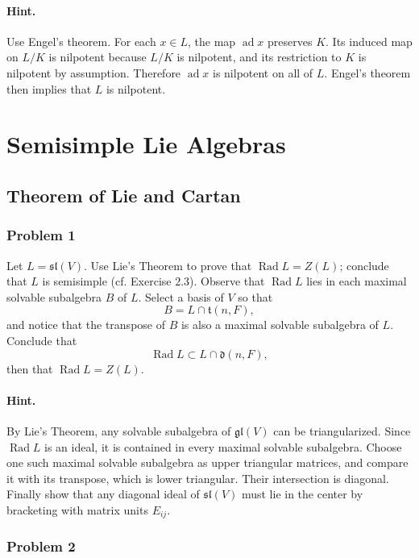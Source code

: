 \documentclass[12pt, a4paper]{article}
\begin{document}
\paragraph{Hint.}
Use Engel's theorem. For each \(x\in L\), the map \(\operatorname{ad}x\) preserves
\(K\). Its induced map on \(L/K\) is nilpotent because \(L/K\) is nilpotent, and
its restriction to \(K\) is nilpotent by assumption. Therefore
\(\operatorname{ad}x\) is nilpotent on all of \(L\). Engel's theorem then
implies that \(L\) is nilpotent.



\section{Semisimple Lie Algebras}

\subsection{Theorem of Lie and Cartan}

\subsubsection{Problem 1}

Let \(L=\mathfrak{sl}(V)\). Use Lie's Theorem to prove that
\(\operatorname{Rad} L=Z(L)\); conclude that \(L\) is semisimple
(cf. Exercise 2.3). Observe that \(\operatorname{Rad}L\) lies in each maximal
solvable subalgebra \(B\) of \(L\). Select a basis of \(V\) so that
\[
B=L\cap \mathfrak{t}(n,F),
\]
and notice that the transpose of \(B\) is also a maximal solvable subalgebra of
\(L\). Conclude that
\[
\operatorname{Rad}L\subset L\cap \mathfrak{d}(n,F),
\]
then that \(\operatorname{Rad}L=Z(L)\).

\paragraph{Hint.}
By Lie's Theorem, any solvable subalgebra of \(\mathfrak{gl}(V)\) can be
triangularized. Since \(\operatorname{Rad}L\) is an ideal, it is contained in
every maximal solvable subalgebra. Choose one such maximal solvable subalgebra
as upper triangular matrices, and compare it with its transpose, which is lower
triangular. Their intersection is diagonal. Finally show that any diagonal
ideal of \(\mathfrak{sl}(V)\) must lie in the center by bracketing with matrix
units \(E_{ij}\).

\subsubsection{Problem 2}
\end{document}
